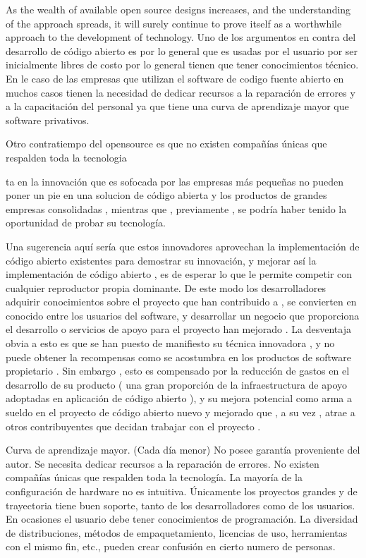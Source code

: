 \documentclass[a4paper,11pt]{article}
\begin{document}
As the wealth of available open source designs increases, and the understanding of the approach spreads, it will surely continue to prove itself as a worthwhile approach to the development of technology.
Uno de los argumentos en contra del desarrollo de código abierto es por lo general que es usadas por el usuario por ser inicialmente libres de costo por lo general tienen que tener conocimientos técnico. En le caso de las empresas que utilizan el software de codigo fuente abierto en muchos casos tienen la necesidad de dedicar recursos a la reparación de errores y a la capacitación del personal ya que tiene una curva de aprendizaje mayor que software privativos.

Otro contratiempo del opensource es que no existen compañías únicas que respalden toda la tecnologia

ta en la innovación que es sofocada por las empresas más pequeñas no pueden poner un pie en una solucion de código abierta y los productos de grandes empresas consolidadas , mientras que , previamente , se podría haber tenido la oportunidad de probar su tecnología. 

 Una sugerencia aquí sería que estos innovadores aprovechan la implementación de código abierto existentes para demostrar su innovación, y mejorar así la implementación de código abierto , es de esperar lo que le permite competir con cualquier reproductor propia dominante. De este modo los desarrolladores adquirir conocimientos sobre el proyecto que han contribuido a , se convierten en conocido entre los usuarios del software, y desarrollar un negocio que proporciona el desarrollo o servicios de apoyo para el proyecto han mejorado . La desventaja obvia a esto es que se han puesto de manifiesto su técnica innovadora , y no puede obtener la recompensas como se acostumbra en los productos de software propietario . Sin embargo , esto es compensado por la reducción de gastos en el desarrollo de su producto ( una gran proporción de la infraestructura de apoyo adoptadas en aplicación de código abierto ), y su
mejora potencial como arma a sueldo en el proyecto de código abierto nuevo y mejorado
que , a su vez , atrae a otros contribuyentes que decidan trabajar con el proyecto .

Curva de aprendizaje mayor. (Cada día menor)
No posee garantía proveniente del autor.
Se necesita dedicar recursos a la reparación de errores.
No existen compañías únicas que respalden toda la tecnología.
La mayoría de la configuración de hardware no es intuitiva.
Únicamente los proyectos grandes y de trayectoria tiene buen soporte, tanto de los desarrolladores como de los usuarios.
En ocasiones el usuario debe tener conocimientos de programación.
La diversidad de distribuciones, métodos de empaquetamiento, licencias de uso, herramientas con el mismo fin, etc., pueden crear confusión en cierto numero de personas.
\end{document}
